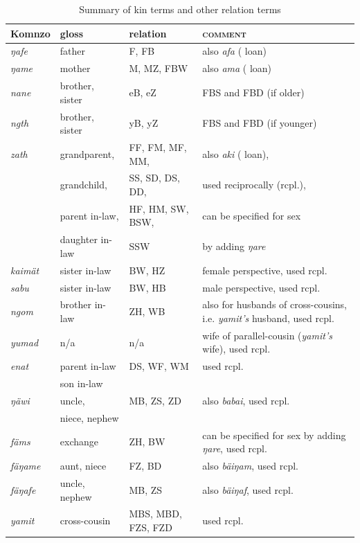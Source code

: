 \renewcommand{\tabcolsep}{2,3pt}
\begin{table}
\caption{Summary of kin terms and other relation terms}
\label{kintermstable}
	\begin{tabularx}{\textwidth}{llp{3cm}Q}
		\lsptoprule
			{Komnzo} & {gloss}&{relation} & \textsc{comment}\\\midrule
			\emph{ŋafe} & father & F, FB & also \emph{afa} ( loan)\\
			\emph{ŋame} & mother & M, MZ, FBW & also \emph{ama} ( loan)\\
			\emph{nane} & brother, sister & eB, eZ & FBS and FBD (if older)\\
			\emph{ngth} & brother, sister & yB, yZ & FBS and FBD (if younger)\\
			\emph{zath} & grandparent,&FF, FM, MF, MM, & also \emph{aki} ( loan),\\
			&grandchild,&SS, SD, DS, DD, &used reciprocally (rcpl.), \\
			&parent in-law,&HF, HM, SW, BSW, &can be specified for sex\\
			&daughter in-law&SSW &by adding \emph{ŋare}\\
			\emph{kaimät} & sister in-law & BW, HZ & female perspective, used rcpl.\\
			\emph{sabu} & sister in-law & BW, HB & male perspective, used rcpl.\\
			\emph{ngom} & brother in-law & ZH, WB & also for husbands of cross-cousins, i.e. \emph{yamit's} husband, used rcpl.\\
			\emph{yumad} & n/a & n/a & wife of parallel-cousin (\emph{yamit's} wife), used rcpl.\\
			\emph{enat} &parent in-law& DS, WF, WM&used rcpl.\\
			&son in-law&&\\
			\emph{ŋäwi} & uncle,& MB, ZS, ZD	& also \emph{babai}, used rcpl.\\
			&niece, nephew&&\\
			\emph{fäms} & exchange	& ZH, BW & can be specified for sex by adding \emph{ŋare}, used rcpl.\\
			\emph{fäŋame} & aunt, niece & FZ, BD&also \emph{bäiŋam}, used rcpl.\\
			\emph{fäŋafe} & uncle, nephew & MB, ZS&also \emph{bäiŋaf}, used rcpl.\\
			\emph{yamit} & cross-cousin & MBS, MBD, FZS, FZD & used rcpl.\\

\end{tabularx}
\end{table}
